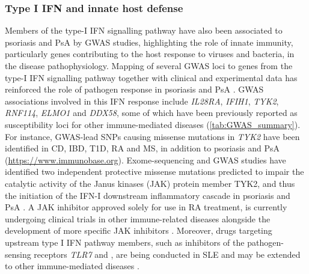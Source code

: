 \subsubsection*{Type I IFN and innate host defense}

Members of the type-I IFN signalling pathway have also been associated to psoriasis and PsA by GWAS studies, highlighting the role of innate immunity, particularly genes contributing to the host response to viruses and bacteria, in the disease pathophysiology. Mapping of several GWAS loci to genes from the type-I IFN signalling pathway together with clinical and experimental data has reinforced the role of pathogen response in psoriasis and PsA \parencite{Nestle2005}. GWAS associations involved in this IFN response include \textit{IL28RA}, \textit{IFIH1}, \textit{TYK2}, \textit{RNF114}, \textit{ELMO1} and \textit{DDX58}, some of which have been previously reported as susceptibility loci for other immune-mediated diseases (\ref{tab:GWAS_summary}). For instance, GWAS-lead SNPs causing missense mutations in \textit{TYK2} have been identified in CD, IBD, T1D, RA and MS, in addition to psoriasis and PsA (\url{https://www.immunobase.org}). %
Exome-sequencing and GWAS studies have identified two independent protective missense mutations predicted to impair the catalytic activity of the Janus kinases (JAK) protein member TYK2, and thus the initiation of the IFN-I downstream inflammatory cascade in psoriasis and PsA \parencite{Strange2010, Tsoi2012, Dand2017}. A JAK inhibitor approved solely for use in RA treatment, is currently undergoing clinical trials in other immune-related diseases alongside the development of more specific JAK inhibitors \parencite{Baker2017}. Moreover, drugs targeting upstream type I IFN pathway members, such as inhibitors of the pathogen-sensing receptors \textit{TLR7} and \parencite{TLR9}, are being conducted in SLE and may be extended to other immune-mediated diseases \parencite{Baker2017}. 

